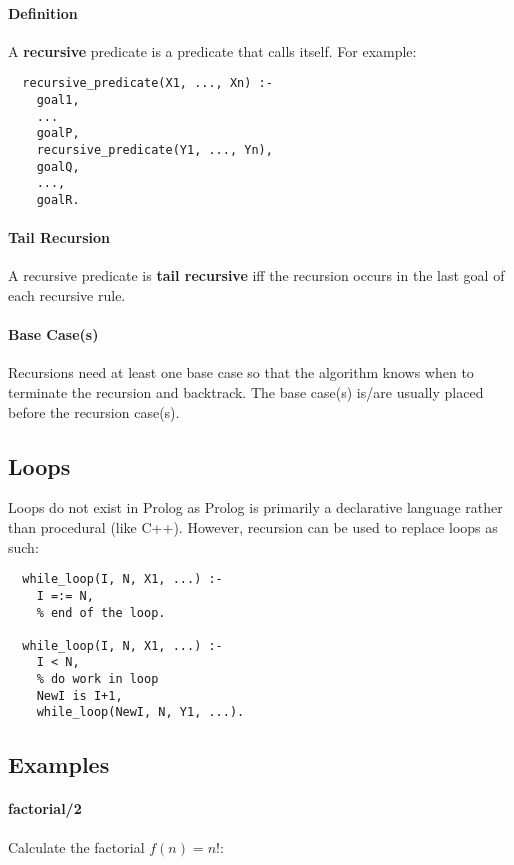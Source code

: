 \documentclass{article}
\begin{document}
\begin{multicols}{2}
  \paragraph{Definition} A {\bf recursive} predicate is a predicate that calls itself. For example:
  
  \begin{lstlisting}
  recursive_predicate(X1, ..., Xn) :-
    goal1,
    ...
    goalP,
    recursive_predicate(Y1, ..., Yn),
    goalQ,
    ...,
    goalR.
  \end{lstlisting}
  
  \paragraph{Tail Recursion} A recursive predicate is {\bf tail recursive} iff the recursion occurs in the last goal of each recursive rule. 
  
  \paragraph{Base Case(s)} Recursions need at least one base case so that the algorithm knows when to terminate the recursion and backtrack. The base case(s) is/are usually placed before the recursion case(s).
  
  \subsection{Loops}
  
  Loops do not exist in Prolog as Prolog is primarily a declarative language rather than procedural (like C++). However, recursion can be used to replace loops as such:
  
  \begin{lstlisting}
  while_loop(I, N, X1, ...) :-
    I =:= N,
    % end of the loop.
  
  while_loop(I, N, X1, ...) :-
    I < N,
    % do work in loop
    NewI is I+1,
    while_loop(NewI, N, Y1, ...).
  \end{lstlisting}
  
  \subsection{Examples}  
  
  \paragraph{factorial/2} Calculate the factorial $f(n) = n!$:
  

\end{multicols}
\end{document}
